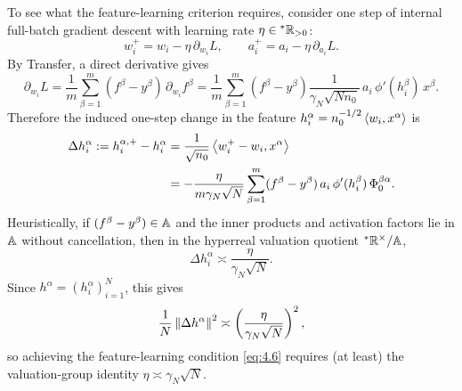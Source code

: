To see what the feature-learning criterion requires, consider one step of internal full-batch gradient descent with learning rate $\eta \in {}^*\mathbb{R}_{>0}$:
\begin{equation}\label{eq:4.7}
w_i^+ = w_i - \eta\,\partial_{w_i} L, \qquad a_i^+ = a_i - \eta\,\partial_{a_i} L.
\end{equation}
By Transfer, a direct derivative gives
\begin{equation}\label{eq:4.8}
\partial_{w_i} L = \frac{1}{m}\sum_{\beta=1}^m (f^\beta - y^\beta)\,\partial_{w_i} f^\beta = \frac{1}{m}\sum_{\beta=1}^m (f^\beta - y^\beta)\frac{1}{\gamma_N\sqrt{N n_0}}\,a_i\,\phi'(h_i^\beta)\,x^\beta.
\end{equation}
Therefore the induced one-step change in the feature $h_i^\alpha = n_0^{-1/2}\left\langle w_i, x^\alpha \right\rangle$ is
\begin{equation}\label{eq:4.9}
\begin{aligned}
\Delta h_i^\alpha := h_i^{\alpha, +} - h_i^\alpha &= \frac{1}{\sqrt{n_0}}\left\langle w_i^+ - w_i, x^\alpha \right\rangle \\
&= -\frac{\eta}{m\gamma_N\sqrt{N}} \sum_{\beta=1}^m (f^\beta - y^\beta)\,a_i\,\phi'(h_i^\beta)\,\Phi_0^{\beta\alpha}.
\end{aligned}
\end{equation}
Heuristically, if $(f^\beta - y^\beta) \in \mathbb{A}$ and the inner products and activation factors lie in $\mathbb{A}$ without cancellation, then in the hyperreal valuation quotient ${}^*\mathbb{R}^\times / \mathbb{A}$,
\begin{equation}\label{eq:4.10}
\Delta h_i^\alpha \asymp \frac{\eta}{\gamma_N\sqrt{N}}.
\end{equation}
Since $h^\alpha = (h_i^\alpha)_{i=1}^N$, this gives
\begin{equation}\label{eq:4.11}
\frac{1}{N}\left\lVert \Delta h^\alpha \right\rVert^2 \asymp \left(\frac{\eta}{\gamma_N\sqrt{N}}\right)^2,
\end{equation}
so achieving the feature-learning condition \eqref{eq:4.6} requires (at least) the valuation-group identity $\eta \asymp \gamma_N\sqrt{N}$.

